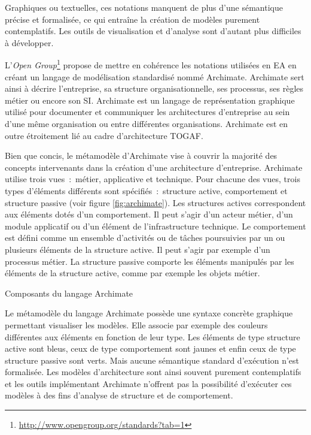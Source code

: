 Graphiques ou textuelles, ces notations manquent de plus d'une sémantique précise et formalisée, ce qui entraîne la création de modèles purement contemplatifs. Les outils de visualisation et d'analyse sont d'autant plus difficiles à développer.

L'\textit{Open Group}\footnote{\url{http://www.opengroup.org/standards?tab=1}} propose de mettre en cohérence les notations utilisées en EA en créant un langage de modélisation standardisé nommé Archimate. Archimate sert ainsi à décrire l'entreprise, sa structure organisationnelle, ses processus, ses règles métier ou encore son SI. Archimate est un langage de représentation graphique utilisé pour documenter et communiquer les architectures d'entreprise au sein d'une même organisation ou entre différentes organisations. Archimate est en outre étroitement lié au cadre d'architecture TOGAF. 

Bien que concis, le métamodèle d'Archimate vise à couvrir la majorité des concepts intervenants dans la création d'une architecture d'entreprise. Archimate utilise trois vues~:~métier, applicative et technique. Pour chacune des vues, trois types d'éléments différents sont spécifiés~:~structure active, comportement et structure passive (voir figure \ref{fig:archimate}). Les structures actives correspondent aux éléments dotés d'un comportement. Il peut s'agir d'un acteur métier, d'un module applicatif ou d'un élément de l'infrastructure technique. Le comportement est défini comme un ensemble d'activités ou de tâches poursuivies par un ou plusieurs éléments de la structure active. Il peut s'agir par exemple d'un processus métier. La structure passive comporte les éléments manipulés par les éléments de la structure active, comme par exemple les objets métier. 

\begin{table}[!ht]
    \centering
    
    \caption{Composants du langage Archimate}
    \label{fig:archimate}
\end{table}

Le métamodèle du langage Archimate possède une syntaxe concrète graphique permettant visualiser les modèles. Elle associe par exemple des couleurs différentes aux éléments en fonction de leur type. Les éléments de type structure active sont bleus, ceux de type comportement sont jaunes et enfin ceux de type structure passive sont verts. Mais aucune sémantique standard d'exécution n'est formalisée. Les modèles d'architecture sont ainsi souvent purement contemplatifs et les outils implémentant Archimate n'offrent pas la possibilité d'exécuter ces modèles à des fins d'analyse de structure et de comportement. 

